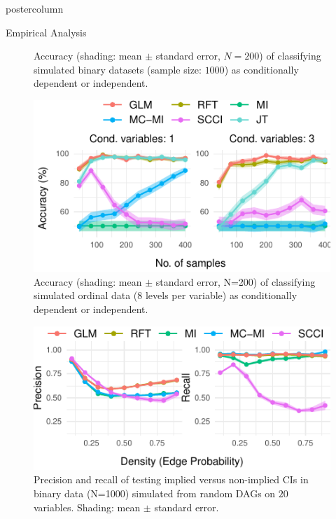 \documentclass{beamer}
\begin{document}
\begin{frame}
\begin{columns}
\begin{column}{.33\textwidth}
\begin{beamercolorbox}[center]{postercolumn}
\begin{minipage}{.98\textwidth}
{\begin{myblock}{Empirical Analysis}
\begin{figure}
			\caption{Accuracy (shading: mean $\pm$ standard error, $N=200$) of classifying
			simulated binary datasets (sample size: $1000$) as conditionally
			dependent or independent.}
			\label{fig:cat_discrimination}
		\end{figure}
		\begin{figure}
			\centering
			\includegraphics[scale=3]{../in_person/imgs/accuracy_ordinal.pdf}
			\caption{Accuracy (shading: mean $\pm$ standard error, N=200) of
				classifying simulated ordinal data (8 levels per variable) as
				conditionally dependent or independent.}
			\label{fig:accuracy_ord}
		\end{figure}
		\begin{figure}
			\centering
			\includegraphics[scale=3]{../in_person/imgs/model_testing.pdf}
			\caption{Precision and recall of testing implied versus non-implied CIs
				 in binary data (N=1000) simulated from random DAGs on $ 20 $ variables.
				 Shading: mean $\pm$ standard error.} 
			\label{fig:model_testing}
		\end{figure}
	\end{myblock}
		}\end{minipage}\end{beamercolorbox}
	\end{column}



\end{columns}
\end{frame}
\end{document}
